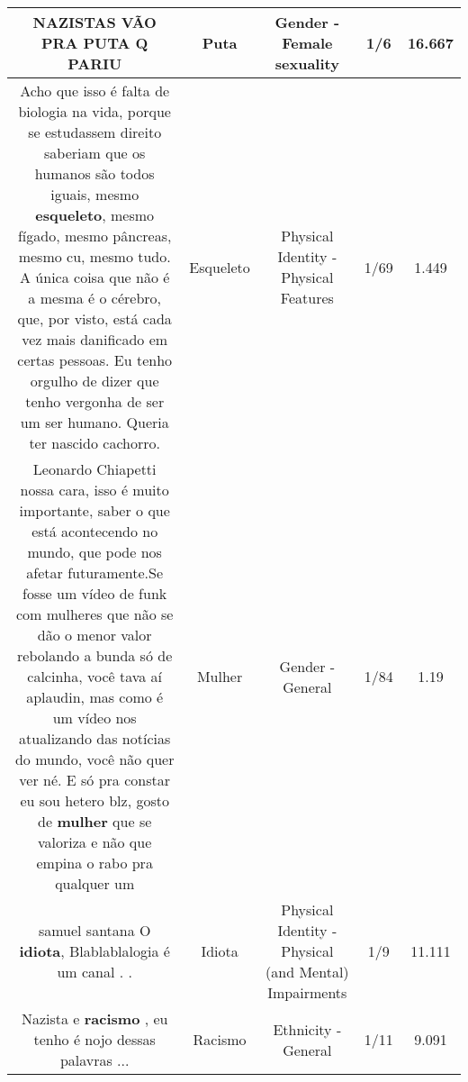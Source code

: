 \documentclass[11pt]{article}
\newlength\mylength
\begin{document}
\begin{center}
\begin{longtable}{|C{.65\mylength}|C{.30\mylength}|C{.12\mylength}|C{.12\mylength}|C{.12\mylength}|}
  \small NAZISTAS VÃO PRA  \textbf{PUTA} Q PARIU\normalsize   & Puta & Gender - Female sexuality & 1/6 & 16.667 \\  \hline
  \small Acho que isso é falta de biologia na vida, porque se estudassem direito saberiam que os humanos são todos iguais, mesmo \textbf{esqueleto}, mesmo fígado, mesmo pâncreas, mesmo cu, mesmo tudo. A única coisa que não é a mesma é o cérebro, que, por visto, está cada vez mais danificado em certas pessoas. Eu tenho orgulho de dizer que tenho vergonha de ser um ser humano. Queria ter nascido cachorro.\normalsize   & Esqueleto & Physical Identity - Physical Features & 1/69 & 1.449 \\  \hline
  \small Leonardo Chiapetti nossa cara, isso é muito importante, saber o que está acontecendo no mundo, que pode nos afetar futuramente.Se fosse um vídeo de funk com mulheres que não se dão o menor valor rebolando a bunda só de calcinha, você tava aí aplaudin, mas como é um vídeo nos atualizando das notícias do mundo, você não quer ver né. E só pra constar eu sou hetero blz, gosto de \textbf{mulher} que se valoriza e não que empina o rabo pra qualquer um\normalsize   & Mulher & Gender - General & 1/84 & 1.19 \\  \hline
  \small samuel santana O \textbf{idiota}, Blablablalogia é um canal . .\normalsize   & Idiota & Physical Identity - Physical (and Mental) Impairments & 1/9 & 11.111 \\  \hline
  \small Nazista e \textbf{racismo} , eu tenho é nojo dessas palavras ...\normalsize   & Racismo & Ethnicity - General & 1/11 & 9.091 \\  \hline

\end{longtable}
\end{center}
\end{document}

